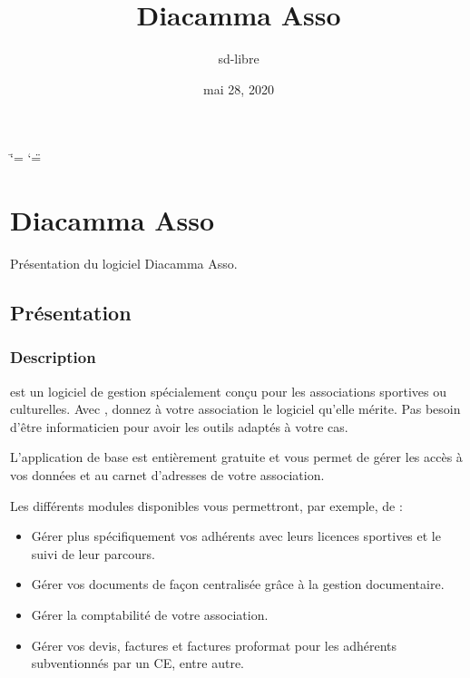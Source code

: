 \documentclass[a4paper,10pt,oneside,french]{sphinxmanual}
\title{Diacamma Asso}
\date{mai 28, 2020}
\author{sd-libre}
\begin{document}
\ifdefined\shorthandoff
  \ifnum\catcode`\=\string=\active\shorthandoff{=}\fi
  \ifnum\catcode`\"=\active{}\fi
\fi

\pagestyle{empty}
\sphinxmaketitle
\pagestyle{plain}
\sphinxtableofcontents
\pagestyle{normal}
\label{\detokenize{index::doc}}



\chapter{Diacamma Asso}
\label{\detokenize{asso/index:diacamma-asso}}\label{\detokenize{asso/index::doc}}
Présentation du logiciel Diacamma Asso.


\section{Présentation}
\label{\detokenize{asso/presentation:presentation}}\label{\detokenize{asso/presentation::doc}}

\subsection{Description}
\label{\detokenize{asso/presentation:description}}
 est un logiciel de gestion spécialement conçu pour les associations sportives ou culturelles.
Avec , donnez à votre association le logiciel qu’elle mérite. Pas besoin d’être informaticien pour avoir les outils adaptés à votre cas.

L’application de base est entièrement gratuite et vous permet de gérer les accès à vos données et au carnet d’adresses de votre association.

Les différents modules disponibles vous permettront, par exemple, de :
\begin{itemize}
\item {} 
Gérer plus spécifiquement vos adhérents avec leurs licences sportives et le suivi de leur parcours.

\item {} 
Gérer vos documents de façon centralisée grâce à la gestion documentaire.

\item {} 
Gérer la comptabilité de votre association.

\item {} 
Gérer vos devis, factures et factures proformat pour les adhérents subventionnés par un CE, entre autre.

\end{itemize}
\end{document}
